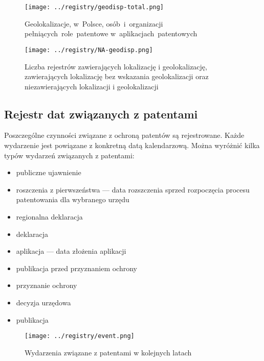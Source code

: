 \begin{figure}[H]\centering
\texttt{[image: ../registry/geodisp-total.png]}
\caption{Geolokalizacje,
         w~Polsce,
         osób~i~organizacji 
         pełniących~role~patentowe 
         w~aplikacjach~patentowych}
\label{fig:geodisp.png}
\end{figure}

\begin{figure}[H]\centering
\texttt{[image: ../registry/NA-geodisp.png]}
\caption{Liczba rejestrów zawierających lokalizację i geolokalizację,
         zawierających lokalizację bez wskazania geolokalizacji
         oraz niezawierających lokalizacji i geolokalizacji}
\label{fig:geodisp.png}
\end{figure}



\subsection{Rejestr dat związanych z patentami}

Poszczególne czynności związane z ochroną patentów są rejestrowane.
Każde wydarzenie jest powiązane z konkretną datą kalendarzową.
Można wyróżnić kilka typów wydarzeń związanych z patentami:

\begin{itemize}
\item publiczne ujawnienie 
\item roszczenia z pierwszeństwa  --- 
      data rozszczenia sprzed rozpoczęcia procesu patentowania dla wybranego urzędu
\item regionalna deklaracja 
\item deklaracja 
\item aplikacja  --- data złożenia aplikacji
\item publikacja przed przyznaniem ochrony 
\item przyznanie ochrony 
\item decyzja urzędowa
\item publikacja
\end{itemize}

\begin{figure}[H]\centering
\texttt{[image: ../registry/event.png]}
\caption{Wydarzenia związane z patentami w kolejnych latach}
\label{fig:geodisp.png}
\end{figure}

